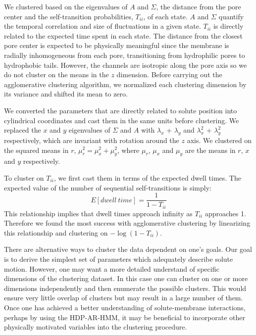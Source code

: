 \documentclass[journal=jpcbfk,manuscript=article]{achemso}
\begin{document}
  We clustered based on the eigenvalues of $A$ and $\Sigma$, the distance from the 
  pore center and the self-transition probabilities, $T_{ii}$, of each state. $A$ 
  and $\Sigma$ quantify the temporal correlation and size of fluctuations in a 
  given state. $T_{ii}$ is directly related to the expected time spent in each state.
  The distance from the closest pore center is expected to be physically meaningful
  since the membrane is radially inhomogeneous from each pore, transitioning from 
  hydrophilic pores to hydrophobic tails. However, the channels are isotropic along
  the pore axis so we do not cluster on the means in the $z$ dimension. Before carrying
  out the agglomerative clustering algorithm, we normalized each clustering dimension
  by its variance and shifted its mean to zero.
  
  We converted the parameters that are directly related to solute position into 
  cylindrical coordinates and cast them in the same units before clustering. 
  We replaced the $x$ and $y$ eigenvalues of $\Sigma$ and $A$ with $\lambda_x$ + 
  $\lambda_y$ and $\lambda_x^2$ + $\lambda_y^2$ respectively, which are invariant with 
  rotation around the $z$ axis. We clustered on the squared means in $r$, $\mu_r^2 = 
  \mu_x^2 + \mu_y^2$, where $\mu_r$, $\mu_x$ and $\mu_y$ are the means in $r$, $x$ and
  $y$ respectively.

  To cluster on $T_{ii}$, we first cast them in terms of the expected dwell times. The expected
  value of the number of sequential self-transitions is simply:
  \begin{equation}  
   E[dwell~time] = \frac{1}{1 - T_{ii}}
   \label{eqn:dwell_times}
  \end{equation}  
  This relationship implies that dwell times approach infinity as $T_{ii}$ approaches
  1. Therefore we found the most success with agglomerative clustering by linearizing this
  relationship and clustering on $-\log(1 - T_{ii})$.
  
  There are alternative ways to cluster the data dependent on one's goals. Our goal is
  to derive the simplest set of parameters which adequately describe solute motion. 
  However, one may want a more detailed understand of specific dimensions of the 
  clustering dataset. In this case one can cluster on one or more dimensions independently
  and then enumerate the possible clusters. This would ensure very little overlap of
  clusters but may result in a large number of them. Once one has achieved a better 
  understanding of solute-membrane interactions, perhaps by using the HDP-AR-HMM, it may be
  beneficial to incorporate other physically motivated variables into the clustering
  procedure. 
\end{document}
